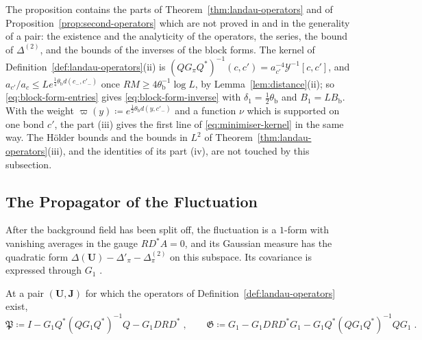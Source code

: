 \documentclass[11pt]{preprint}
\numberwithin{equation}{section}
\begin{document}
The proposition contains the parts of Theorem~\ref{thm:landau-operators} and of Proposition~\ref{prop:second-operators} which are not proved in \cite{BalabanPBG} and \cite{BalabanVAR} in the generality of a pair: the existence and the analyticity of the operators, the series, the bound of $\Delta^{(2)}$, and the bounds of the inverses of the block forms. The kernel of Definition~\ref{def:landau-operators}(ii) is $(QG_\pi Q^*)^{-1}(c, c') = a_{c'}^{-4}\mathcal Y^{-1}[c, c']$, and $a_{c'}/a_c \leqslant Le^{\frac{1}{4}\theta_{\mathrm b}d(c_-, c'_-)}$ once $RM \geqslant 4\theta_{\mathrm b}^{-1}\log L$, by Lemma~\ref{lem:distance}(ii); so \eqref{eq:block-form-entries} gives \eqref{eq:block-form-inverse} with $\delta_1 = \frac{1}{2}\theta_{\mathrm b}$ and $B_1 = LB_{\mathrm b}$. With the weight $\varpi(y) \coloneqq e^{\frac{1}{2}\theta_{\mathrm b}d(y, c'_-)}$ and a function $\nu$ which is supported on one bond $c'$, the part (iii) gives the first line of \eqref{eq:minimiser-kernel} in the same way. The H\"older bounds and the bounds in $L^2$ of Theorem~\ref{thm:landau-operators}(iii), and the identities of its part (iv), are not touched by this subsection.

\subsection{The Propagator of the Fluctuation}\label{sec:fluctuation-propagator}

After the background field has been split off, the fluctuation is a $1$-form with vanishing averages in the gauge $RD^*A = 0$, and its Gaussian measure has the quadratic form $\Delta(\mathbf U) - \Delta'_\pi - \Delta^{(2)}_\pi$ on this subspace. Its covariance is expressed through $G_1$ \cite[(3.139)--(3.153)]{BalabanPBG}.

\begin{definition}\label{def:fluctuation-propagator}
At a pair $(\mathbf U, \mathbf J)$ for which the operators of Definition~\ref{def:landau-operators} exist,
\begin{equation}\label{eq:fluctuation-propagator}
    \mathfrak P \coloneqq I - G_1Q^*(QG_1Q^*)^{-1}Q - G_1DRD^*\;,
    \qquad
    \mathfrak G \coloneqq G_1 - G_1DRD^*G_1 - G_1Q^*(QG_1Q^*)^{-1}QG_1\;.
\end{equation}
\end{definition}
\end{document}
